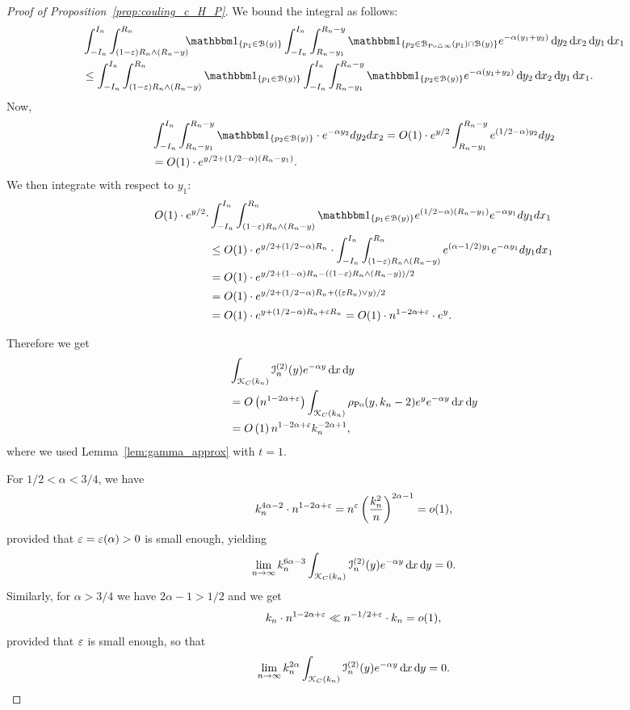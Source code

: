 \begin{proof}[Proof of Proposition~\ref{prop:couling_c_H_P}]
We bound the integral as follows: 
\begin{align*}
	&\int_{-I_n}^{I_n} \int_{(1-\eps) R_n \wedge (R_n-y)}^{R_n} \hspace{-5pt} \ind{p_1 \in \BallHyp{y}}
		\int_{-I_n}^{I_n} \int_{R_n - y_1}^{R_n - y} \ind{p_2 \in \BallSym{p_1} \cap \BallHyp{y}}
		e^{-\alpha(y_1 + y_2)} \dd y_2 \dd x_2 \dd y_1 \dd x_1 \\
	&\leq \int_{-I_n}^{I_n} \int_{(1-\eps) R_n \wedge (R_n-y)}^{R_n} \ind{p_1 \in \BallHyp{y}}
		\int_{-I_n}^{I_n} \int_{R_n - y_1}^{R_n - y} 
		\ind{p_2 \in  \BallHyp{y}} e^{-\alpha(y_1 + y_2)} \dd y_2 \dd x_2 \dd y_1 \dd x_1.
\end{align*}
Now,
\begin{align*}
&\int_{-I_n}^{I_n} \int_{R_n - y_1}^{R_n - y} \ind{p_2 \in  \BallHyp{y}} \cdot  
e^{-\alpha y_2} dy_2 dx_2 = O(1) \cdot e^{y/2} \int_{R_n - y_1}^{R_n - y} e^{(1/2 - \alpha) y_2} dy_2 \\
&= O(1) \cdot e^{y/2 + (1/2 - \alpha) (R_n - y_1)}.
\end{align*}
We then integrate with respect to $y_1$:
\begin{align*}
	O(1) \cdot e^{y/2} \cdot 
	&\int_{-I_n}^{I_n} \int_{(1-\eps) R_n \wedge (R_n-y)}^{R_n} \ind{p_1 \in \BallHyp{y}} 
		e^{(1/2 - \alpha) (R_n - y_1)} e^{-\alpha y_1} dy_1 dx_1 \\
	&\le O(1) \cdot e^{y/2 + (1/2 -\alpha) R_n} \cdot \int_{-I_n}^{I_n} \int_{(1-\eps) R_n \wedge (R_n-y)}^{R_n} 
		e^{(\alpha -1/2) y_1} e^{-\alpha y_1} dy_1dx_1 \\
	&=O(1) \cdot e^{y/2 + (1 -\alpha) R_n -((1-\eps) R_n \wedge (R_n-y))/2} \\
	&=O(1) \cdot e^{y/2 + (1/2 -\alpha) R_n + ((\eps R_n) \vee y)/2}\\
	&=O(1) \cdot e^{y + (1/2 -\alpha) R_n + \eps R_n}
		= O(1) \cdot n^{1- 2\alpha+ \eps} \cdot e^{y}. 
\end{align*}

Therefore we get
\begin{align*} 
	&\int_{{\mathcal K}_{C}(k_n)}\mathcal{I}_n^{(2)}(y) e^{-\alpha y} \operatorname{\mathrm{d}\hspace{-2pt}} x \operatorname{\mathrm{d}\hspace{-2pt}} y\\
	&= O\left( n^{1-2\alpha + \varepsilon} \right)
		\int_{{\mathcal K}_{C}(k_n)} \rho_{{\mathrm{Po}}}(y,k_n-2) e^{y} e^{-\alpha y} \operatorname{\mathrm{d}\hspace{-2pt}} x \operatorname{\mathrm{d}\hspace{-2pt}} y\\
	&= O\left(1\right) n^{1-2\alpha + \varepsilon} k_n^{-2\alpha + 1},
\end{align*}
where we used Lemma~\ref{lem:gamma_approx} with $t = 1$.

For $1/2 < \alpha < 3/4$, we have
\[
	k_n^{4 \alpha -2} \cdot  n^{1-2\alpha + \varepsilon} = n^{\varepsilon} \left( \frac{k_n^2}{n}\right)^{2\alpha -1} = o(1),
\]
provided that $\varepsilon = \varepsilon (\alpha)>0$ is small enough, yielding
\[
	\lim_{n \to \infty} k_n^{6\alpha - 3} 
			\int_{{\mathcal K}_{C}(k_n)}\mathcal{I}_n^{(2)}(y) e^{-\alpha y} \operatorname{\mathrm{d}\hspace{-2pt}} x \operatorname{\mathrm{d}\hspace{-2pt}} y = 0.
\]
Similarly, for $\alpha > 3/4$ we have $2\alpha -1 > 1/2$ and we get
\[
	k_n \cdot n^{1-2\alpha + \varepsilon} \ll n^{-1/2 + \varepsilon}  \cdot k_n  = o(1),
\]
provided that $\varepsilon$ is small enough, so that
\[
	\lim_{n \to \infty} k_n^{2\alpha}
			\int_{{\mathcal K}_{C}(k_n)} \mathcal{I}_n^{(2)}(y) e^{-\alpha y} \operatorname{\mathrm{d}\hspace{-2pt}} x \operatorname{\mathrm{d}\hspace{-2pt}} y = 0.
\]


\end{proof}
